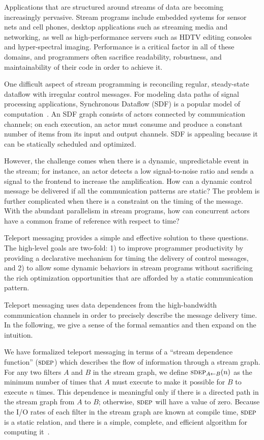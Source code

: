\documentclass{csailabstractbook}
\begin{document}
Applications that are structured around streams of data are becoming
increasingly pervasive.  Stream programs include embedded systems for
sensor nets and cell phones, desktop applications such as streaming
media and networking, as well as high-performance servers such as HDTV
editing consoles and hyper-spectral imaging.  Performance is a
critical factor in all of these domains, and programmers often
sacrifice readability, robustness, and maintainability of their code
in order to achieve it.

One difficult aspect of stream programming is reconciling regular,
steady-state dataflow with irregular control messages.  For modeling
data paths of signal processing applications, Synchronous Dataflow
(SDF) is a popular model of computation~\cite{LM87-i}.  An SDF graph
consists of actors connected by communication channels; on each
execution, an actor must consume and produce a constant number of
items from its input and output channels.  SDF is appealing because it
can be statically scheduled and optimized.

However, the challenge comes when there is a dynamic, unpredictable
event in the stream; for instance, an actor detects a low
signal-to-noise ratio and sends a signal to the frontend to increase
the amplification.  How can a dynamic control message be delivered if
all the communication patterns are static?  The problem is further
complicated when there is a constraint on the timing of the message.
With the abundant parallelism in stream programs, how can concurrent
actors have a common frame of reference with respect to time?  

Teleport messaging provides a simple and effective solution to these
questions.  The high-level goals are two-fold: 1) to improve
programmer productivity by providing a declarative mechanism for
timing the delivery of control messages, and 2) to allow some dynamic
behaviors in stream programs without sacrificing the rich optimization
opportunities that are afforded by a static communication pattern.


Teleport messaging uses data dependences from the high-bandwidth
communication channels in order to precisely describe the message
delivery time.  In the following, we give a sense of the formal
semantics and then expand on the intuition.

We have formalized teleport messaging in terms of a ``stream
dependence function'' ($\textsc{sdep}$) which describes the flow of
information through a stream graph.  For any two filters $A$ and $B$
in the stream graph, we define $\textsc{sdep}_{A \small{\leftarrow}
B}(n)$ as the minimum number of times that $A$ must execute to make it
possible for $B$ to execute $n$ times.  This dependence is meaningful
only if there is a directed path in the stream graph from $A$ to $B$;
otherwise, $\textsc{sdep}$ will have a value of zero.  Because the I/O
rates of each filter in the stream graph are known at compile time,
$\textsc{sdep}$ is a static relation, and there is a simple, complete,
and efficient algorithm for computing it~\cite{sdep04}.
\end{document}
